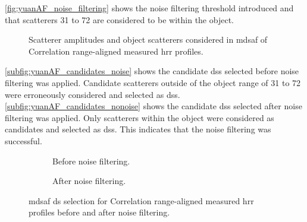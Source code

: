 \documentclass[class=report,11pt,crop=false]{standalone}
\begin{document}
    \autoref{fig:yuanAF_noise_filtering} shows the noise filtering threshold introduced and that scatterers 31 to 72 are considered to be within the object.
    \begin{figure}
        \centering
        \resizebox{0.4\linewidth}{!}{}
        \caption{Scatterer amplitudes and object scatterers considered in \gls{mdsaf} of Correlation range-aligned measured \gls{hrr} profiles.} \label{fig:yuanAF_noise_filtering}
    \end{figure}

    \autoref{subfig:yuanAF_candidates_noise} shows the candidate \gls{ds}s selected before noise filtering was applied. Candidate scatterers outside of the object range of 31 to 72 were erroneously considered and selected as \gls{ds}s. \autoref{subfig:yuanAF_candidates_nonoise} shows the candidate \gls{ds}s selected after noise filtering was applied. Only scatterers within the object were considered as candidates and selected as \gls{ds}s. This indicates that the noise filtering was successful. 
    
    \begin{figure}[H]
        \centering
        \begin{subfigure}{0.3\linewidth}
            \resizebox{\linewidth}{!}{}
            \caption{Before noise filtering. \label{subfig:yuanAF_candidates_noise}}
        \end{subfigure}
        \hspace{0.5cm}
        \begin{subfigure}{0.3\linewidth}
            \resizebox{\linewidth}{!}{}
            \caption{After noise filtering. \label{subfig:yuanAF_candidates_nonoise}}
        \end{subfigure}
        \caption{\gls{mdsaf} \gls{ds} selection for Correlation range-aligned measured \gls{hrr} profiles before and after noise filtering.} \label{subfig:hayAF_corrRA_measured_2}
    \end{figure}
\end{document}

